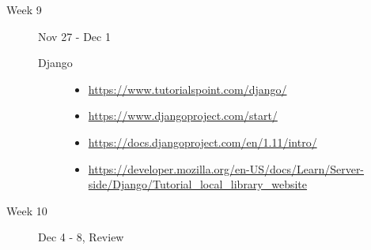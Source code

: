 \documentclass{article}
\newcommand{\myitem}[1]{\item{\scriptsize\url{#1}}}
\begin{document}
\begin{description}
\begin{description}
  \end{description}
\item[Week 9] Nov 27 - Dec 1
  \begin{description}
    
\item[Django]\mbox{}
  \begin{itemize}
  \myitem{https://www.tutorialspoint.com/django/}
  \myitem{https://www.djangoproject.com/start/}
  \myitem{https://docs.djangoproject.com/en/1.11/intro/}
  \myitem{https://developer.mozilla.org/en-US/docs/Learn/Server-side/Django/Tutorial_local_library_website}
  \end{itemize}

  \end{description}
\item[Week 10] Dec 4 - 8, Review


\end{description}
\end{document}
